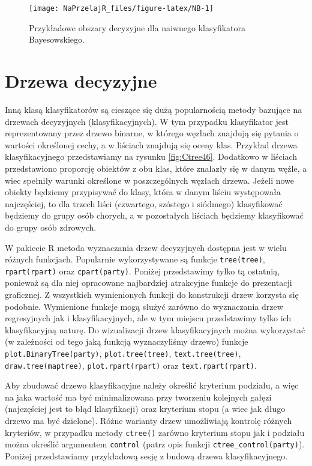 \documentclass[polish,]{book}
\begin{document}
\begin{figure}[h]

{\centering \texttt{[image: NaPrzelajR\_files/figure-latex/NB-1]} 

}

\caption{Przykładowe obszary decyzyjne dla naiwnego klasyfikatora Bayesowskiego.}\label{fig:NB}
\end{figure}

\hypertarget{part_44}{%
\section{Drzewa decyzyjne}\label{part_44}}

Inną klasą klasyfikatorów są cieszące się dużą popularnością metody bazujące na
drzewach decyzyjnych (klasyfikacyjnych). W tym przypadku klasyfikator jest reprezentowany przez drzewo binarne, w którego węzłach znajdują się pytania o wartości
określonej cechy, a w liściach znajdują się oceny klas. Przykład drzewa klasyfikacyjnego przedstawiamy na rysunku \ref{fig:Ctree46}. Dodatkowo w liściach przedstawiono proporcję
obiektów z obu klas, które znalazły się w danym węźle, a wiec spełniły warunki
określone w poszczególnych węzłach drzewa. Jeżeli nowe obiekty będziemy przypisywać do klasy, która w danym liściu występowała najczęściej, to dla trzech liści
(czwartego, szóstego i siódmego) klasyfikować będziemy do grupy osób chorych, a w
pozostałych liściach będziemy klasyfikować do grupy osób zdrowych.

W pakiecie R metoda wyznaczania drzew decyzyjnych dostępna jest w wielu różnych funkcjach. Popularnie wykorzystywane są funkcje \texttt{tree(tree)}, \texttt{rpart(rpart)}
oraz \texttt{cpart(party)}. Poniżej przedstawimy tylko tą ostatnią, ponieważ są dla niej
opracowane najbardziej atrakcyjne funkcje do prezentacji graficznej. Z wszystkich
wymienionych funkcji do konstrukcji drzew korzysta się podobnie. Wymienione funkcje mogą służyć zarówno do wyznaczania drzew regresyjnych jak i klasyfikacyjnych, ale w tym miejscu przedstawimy tylko ich klasyfikacyjną naturę. Do wizualizacji drzew klasyfikacyjnych można wykorzystać (w zależności od tego jaką funkcją wyznaczyliśmy drzewo) funkcje \texttt{plot.BinaryTree(party)}, \texttt{plot.tree(tree)},
\texttt{text.tree(tree)}, \texttt{draw.tree(maptree)}, \texttt{plot.rpart(rpart)} oraz \texttt{text.rpart(rpart)}.

Aby zbudować drzewo klasyfikacyjne należy określić kryterium podziału, a więc
na jaka wartość ma być minimalizowana przy tworzeniu kolejnych gałęzi (najczęściej
jest to błąd klasyfikacji) oraz kryterium stopu (a wiec jak długo drzewo ma być dzielone). Różne warianty drzew umożliwiają kontrolę różnych kryteriów, w przypadku
metody \texttt{ctree()} zarówno kryterium stopu jak i podziału można określić argumentem \texttt{control} (patrz opis funkcji \texttt{ctree\_control(party)}). Poniżej przedstawiamy
przykładową sesję z budową drzewa klasyfikacyjnego.
\end{document}
